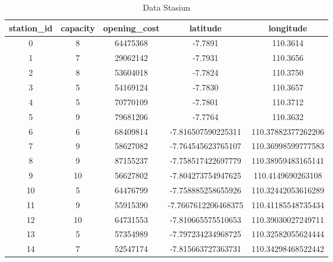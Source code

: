 \documentclass{skripsimathugm}
\begin{document}
\begin{table}[H]
\centering
\caption{Data Stasiun}
\label{Station Data}
\begin{tabular}{|c|c|c|c|c|}
\hline
\textbf{station\_id} & \textbf{capacity} & \textbf{opening\_cost} & \textbf{latitude} & \textbf{longitude} \\
\hline
0 & 8 & 64475368 & -7.7891 & 110.3614 \\
1 & 7 & 29062142 & -7.7931 & 110.3656 \\
2 & 8 & 53604018 & -7.7824 & 110.3750 \\
3 & 5 & 54169124 & -7.7830 & 110.3657 \\
4 & 5 & 70770109 & -7.7801 & 110.3712 \\
5 & 9 & 79681206 & -7.7764 & 110.3632 \\
6 & 6 & 68409814 & -7.816507590225311 & 110.37882377262206 \\
7 & 9 & 58627082 & -7.764545623765107 & 110.36998599777583 \\
8 & 9 & 87155237 & -7.758517422697779 & 110.38959483165141 \\
9 & 10 & 56627802 & -7.804273754947625 & 110.4149690263108 \\
10 & 5 & 64476799 & -7.758885258655926 & 110.32442053616289 \\
11 & 9 & 55915390 & -7.7667612206468375 & 110.41185548735434 \\
12 & 10 & 64731553 & -7.810665575510653 & 110.39030027249711 \\
13 & 5 & 57354989 & -7.797234234968725 & 110.32582055624444 \\
14 & 7 & 52547174 & -7.815663727363731 & 110.34298468522442 \\
\hline
\end{tabular}
\end{table}
\end{document}

